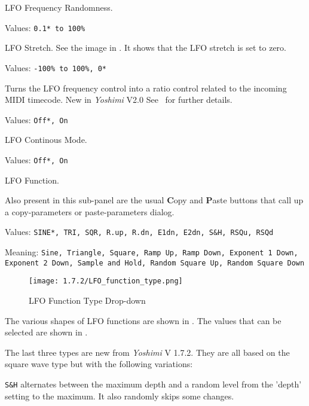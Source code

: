    LFO Frequency Randomness.

   Values: \texttt{0.1* to 100\%}

   LFO Stretch. See the image in
   .
   It shows that the LFO stretch is set to zero.

   Values: \texttt{-100\% to 100\%, 0*}

   Turns the LFO frequency control into a ratio control related to the
   incoming MIDI timecode. New in \textsl{Yoshimi} V2.0 See
   \ for further details.

   Values: \texttt{Off*, On}

   LFO Continous Mode.

   Values: \texttt{Off*, On}

   LFO Function.

   Also present in this sub-panel are the usual \textbf{C}opy
   and \textbf{P}aste buttons that call up a copy-parameters or
   paste-parameters dialog.

   Values: \texttt{SINE*, TRI, SQR, R.up, R.dn, E1dn, E2dn, S\&H, RSQu, RSQd}

   Meaning: \texttt{Sine, Triangle, Square, Ramp Up, Ramp Down, Exponent 1 Down, Exponent 2 Down, Sample and Hold, Random Square Up, Random Square Down}

\begin{figure}[H]
   \centering
   \texttt{[image: 1.7.2/LFO\_function\_type.png]}
   \caption[LFO Type Drop-down]{LFO Function Type Drop-down}
   \label{fig:lfo_function_type_dropdown}
\end{figure}

   The various shapes of LFO functions are shown in
   .
   The values that can be selected are shown in
   .

   The last three types are new from \textsl{Yoshimi} V 1.7.2. They are all
   based on the square wave type but with the following variations:

   \texttt{S\&H} alternates between the maximum depth and a random level
   from the 'depth' setting to the maximum. It also randomly skips some
   changes.

